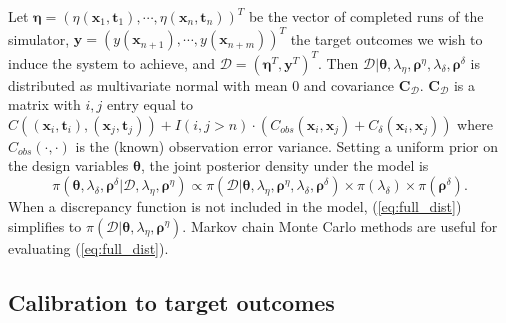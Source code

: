 \documentclass[12pt]{article}
\begin{document}
Let $\boldsymbol \eta = (\eta(\mathbf x_1,\mathbf t_1),\cdots,\eta(\mathbf x_n,\mathbf t_n))^T$ be the vector of completed runs of the simulator, $\mathbf y = (y(\mathbf x_{n+1}),\cdots,y(\mathbf x_{n+m}))^T$ the target outcomes we wish to induce the system to achieve, 
and $\mathcal D = (\boldsymbol \eta^T,\mathbf y^T)^T$.
%
Then $\mathcal D | \boldsymbol \theta,\lambda_\eta, \boldsymbol \rho^\eta,\lambda_\delta,\boldsymbol \rho^\delta$ is distributed as multivariate normal with mean 0 and covariance $\mathbf C_\mathcal D$. 
%
$\mathbf C_\mathcal D$ is a matrix with $i,j$ entry equal to 
$
C((\mathbf x_i,\mathbf t_i),(\mathbf x_j,\mathbf t_j)) + I(i,j>n)\cdot(C_{obs}(\mathbf x_i,\mathbf x_j) + C_\delta(\mathbf x_i,\mathbf x_j))
$
where $C_{obs}(\cdot,\cdot)$ is the (known) observation error variance.
%
Setting a uniform prior on the design variables $\boldsymbol\theta$, the joint posterior density under the model is
%
\begin{equation} \label{eq:full_dist}
\pi(\boldsymbol \theta,\lambda_\delta,\boldsymbol \rho^\delta|\mathcal D,\lambda_\eta,\boldsymbol \rho^\eta)
\propto \pi(\mathcal D | \boldsymbol \theta,\lambda_\eta, \boldsymbol \rho^\eta,\lambda_\delta,\boldsymbol \rho^\delta) \times %
\pi(\lambda_\delta) \times \pi(\boldsymbol \rho^\delta).
\end{equation}
%
When a discrepancy function is not included in the model, 
(\ref{eq:full_dist}) simplifies to 
%
$\pi(\mathcal D | \boldsymbol \theta,\lambda_\eta, \boldsymbol \rho^\eta)$. 
%
Markov chain Monte Carlo methods are useful for evaluating (\ref{eq:full_dist}).

\subsection{Calibration to target outcomes}
\end{document}

